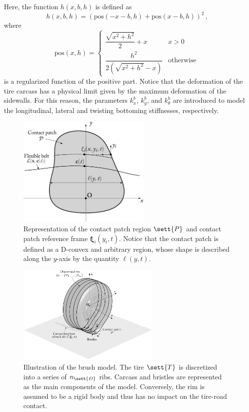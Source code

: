 %
Here, the function $h(x,b,h)$ is defined as
%
\begin{equation*}
  h(x,b,h) = \left(\mathrm{pos}(-x-b, h) + \mathrm{pos}(x-b, h)\right)^2 \, \text{,}
\end{equation*}
%
where
%
\begin{equation*}
  \mathrm{pos}(x,h) =
  \begin{cases}
    \dfrac{\sqrt{x^2 + h^2}}{2}+x    & x > 0 \\[0.5em]
    \dfrac{h^2}{2(\sqrt{x^2+h^2}-x)} & \mathrm{otherwise}
  \end{cases}
\end{equation*}
%
is a regularized function of the positive part. Notice that the deformation of the tire carcass has a physical limit given by the maximum deformation of the sidewalls. For this reason, the parameters $k_x^b$, $k_y^b$, and $k_\theta^b$ are introduced to model the longitudinal, lateral and twisting bottoming stiffnesses, respectively.

\begin{figure}[htb]
  \centering
  \includegraphics[width=6.5cm]{figures/appendix_3/contact_patch_vertical}
  \caption{Representation of the contact patch region $\sett{P}$ and contact patch reference frame $\bm{\xi}_i(y_i,t)$. Notice that the contact patch is defined as a D-convex and arbitrary region, whose shape is described along the $y$-axis by the quantity $\ell(y,t)$.}
  \label{app3:fig:contact_patch_vertical}
\end{figure}

\begin{figure}[htb]
  \centering
  \includegraphics[width=7.0cm, trim={4.35cm 3cm 4.35cm 0cm}, clip]{figures/appendix_3/brush_model}
  \caption{Illustration of the brush model. The tire $\sett{T}$ is discretized into a series of $n_\sett{D}$ ribs. Carcass and bristles are represented as the main components of the model. Conversely, the rim is assumed to be a rigid body and thus has no impact on the tire-road contact.}
  \label{app3:fig:brush_model}
\end{figure}

